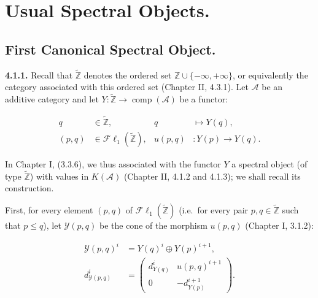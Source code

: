 \chapter{Usual Spectral Objects.}
%
\begingroup
\small
\setlength{\parskip}{0pt}
\setlength{\emergencystretch}{1.5em}
\setlength{\abovedisplayskip}{4pt plus 2pt minus 2pt}%
\setlength{\belowdisplayskip}{4pt plus 2pt minus 2pt}%

\section{First Canonical Spectral Object.}

\noindent\textbf{4.1.1.}\quad
Recall that $\widetilde{\mathbb Z}$ denotes the ordered set
$\mathbb Z\cup\{-\infty,+\infty\}$, or equivalently the category associated
with this ordered set (Chapter II, 4.3.1). Let $\mathcal A$ be an additive
category and let $Y\colon\widetilde{\mathbb Z}\longrightarrow
\operatorname{comp}(\mathcal A)$ be a functor:

\begin{equation}
\begin{aligned}
q&\in\widetilde{\mathbb Z},
  &q&\longmapsto Y(q),\\
(p,q)&\in\mathcal{F}\ell_1(\widetilde{\mathbb Z}),
  &u(p,q)&\colon Y(p)\longrightarrow Y(q).
\end{aligned}
\tag{4.1.1.1}
\end{equation}

In Chapter I, (3.3.6), we thus associated with the functor $Y$ a spectral
object (of type $\widetilde{\mathbb Z}$) with values in $K(\mathcal A)$
(Chapter II, 4.1.2 and 4.1.3); we shall recall its construction.

First, for every element $(p,q)$ of
$\mathcal{F}\ell_1(\widetilde{\mathbb Z})$ (i.e.\ for every pair
$p,q\in\widetilde{\mathbb Z}$ such that $p\leq q$), let $\mathcal Y(p,q)$
be the cone of the morphism $u(p,q)$ (Chapter I, 3.1.2):

\begin{equation}
\begin{aligned}
\mathcal Y(p,q)^i&=Y(q)^i\oplus Y(p)^{i+1},\\
d_{\mathcal Y(p,q)}^i
&=
\begin{pmatrix}
d_{Y(q)}^i & u(p,q)^{i+1}\\
0 & -d_{Y(p)}^{i+1}
\end{pmatrix}.
\end{aligned}
\tag{4.1.1.2}
\end{equation}

